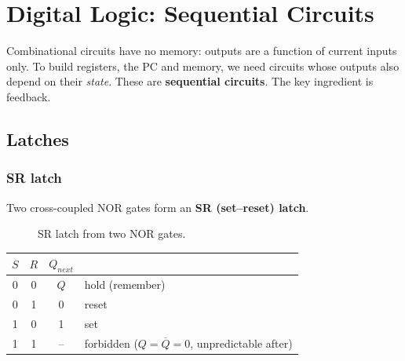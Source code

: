 \chapter{Digital Logic: Sequential Circuits}

Combinational circuits have no memory: outputs are a function of current
inputs only. To build registers, the PC and memory, we need circuits whose
outputs also depend on their \emph{state}. These are \textbf{sequential
circuits}. The key ingredient is feedback.

\section{Latches}

\subsection{SR latch}

Two cross-coupled NOR gates form an \textbf{SR (set--reset) latch}.

\begin{figure}[H]
\centering
{}
\caption{SR latch from two NOR gates.}
\end{figure}

\begin{center}
\begin{tabular}{cc|cl}
\toprule
$S$ & $R$ & $Q_{next}$ & \\
\midrule
0 & 0 & $Q$ & hold (remember) \\
0 & 1 & 0 & reset \\
1 & 0 & 1 & set \\
1 & 1 & -- & forbidden ($Q = \overline{Q} = 0$, unpredictable after) \\
\bottomrule
\end{tabular}
\end{center}

